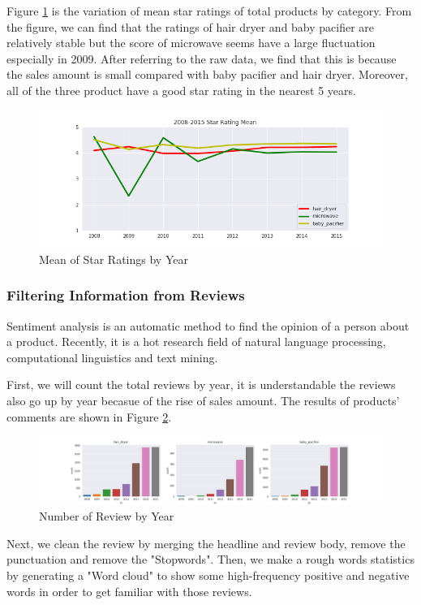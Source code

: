 \documentclass[12pt]{article}  %
\begin{document}
Figure \ref{fig:Rating mean} is the variation of mean star ratings of total products by category. From the figure, we can find that the ratings of hair dryer and baby pacifier are relatively stable but the score of microwave seems have a large fluctuation especially in 2009. After referring to the raw data, we find that this is because the sales amount is small compared with baby pacifier and hair dryer. Moreover, all of the three product have a good star rating in the nearest 5 years.
\begin{figure}[!htbp]
\centering
\includegraphics[width=.8\textwidth]{Rating Mean.png}
\caption{Mean of Star Ratings by Year}\label{fig:Rating mean}
\end{figure}

\subsubsection{Filtering Information from Reviews}
Sentiment analysis is an automatic method to find the opinion of a person about a product. Recently, it is a hot research field of natural language processing, computational linguistics and text mining. \cite{1}

First, we will count the total reviews by year, it is understandable the reviews also go up by year becasue of the rise of sales amount. The results of products' comments are shown in Figure \ref{fig:comment}.\\

\begin{figure}[H]
\centering
\includegraphics[width=.8\textwidth]{count_comment_8year.png}
\caption{Number of Review by Year}\label{fig:comment}
\end{figure}

Next, we clean the review by merging the headline and review body, remove the punctuation and remove the "Stopwords". Then, we make a rough words statistics by generating a "Word cloud" to show some high-frequency positive and negative words in order to get familiar with those reviews.  
\end{document}
